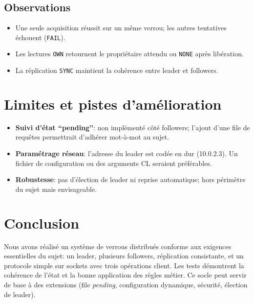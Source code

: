 \documentclass[a4paper,11pt]{article}
\begin{document}
\subsection*{Observations}
\begin{itemize}
\item Une seule acquisition réussit sur un même verrou; les autres tentatives échouent (\texttt{FAIL}).
\item Les lectures \texttt{OWN} retournent le propriétaire attendu ou \texttt{NONE} après libération.
\item La réplication \texttt{SYNC} maintient la cohérence entre leader et followers.
\end{itemize}

\section{Limites et pistes d'amélioration}
\begin{itemize}
\item \textbf{Suivi d'état ``pending''}: non implémenté côté followers; l'ajout d'une file de requêtes permettrait d'adhérer mot-à-mot au sujet.
\item \textbf{Paramétrage réseau}: l'adresse du leader est codée en dur (10.0.2.3). Un fichier de configuration ou des arguments CL seraient préférables.
\item \textbf{Robustesse}: pas d'élection de leader ni reprise automatique; hors périmètre du sujet mais envisageable.
\end{itemize}

\section{Conclusion}
Nous avons réalisé un système de verrous distribués conforme aux exigences essentielles du sujet: un leader, plusieurs followers, réplication consistante, et un protocole simple sur sockets avec trois opérations client. Les tests démontrent la cohérence de l'état et la bonne application des règles métier. Ce socle peut servir de base à des extensions (file \emph{pending}, configuration dynamique, sécurité, élection de leader).
\end{document}
